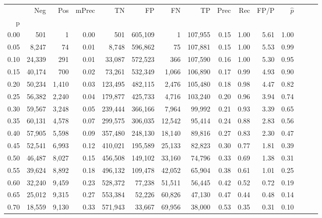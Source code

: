 \begin{tabular}{rrrrrrrrrrrrrrr}
\toprule
{} &     Neg &    Pos & mPrec &       TN &       FP &       FN &       TP &  Prec &   Rec &  FP/P & $\hat{p}$ \\
p    &         &        &       &          &          &          &          &       &       &       &           \\
\midrule
0.00 &     501 &      1 &  0.00 &      501 &  605,109 &        1 &  107,955 &  0.15 &  1.00 &  5.61 &      1.00 \\
0.05 &   8,247 &     74 &  0.01 &    8,748 &  596,862 &       75 &  107,881 &  0.15 &  1.00 &  5.53 &      0.99 \\
0.10 &  24,339 &    291 &  0.01 &   33,087 &  572,523 &      366 &  107,590 &  0.16 &  1.00 &  5.30 &      0.95 \\
0.15 &  40,174 &    700 &  0.02 &   73,261 &  532,349 &    1,066 &  106,890 &  0.17 &  0.99 &  4.93 &      0.90 \\
0.20 &  50,234 &  1,410 &  0.03 &  123,495 &  482,115 &    2,476 &  105,480 &  0.18 &  0.98 &  4.47 &      0.82 \\
0.25 &  56,382 &  2,240 &  0.04 &  179,877 &  425,733 &    4,716 &  103,240 &  0.20 &  0.96 &  3.94 &      0.74 \\
0.30 &  59,567 &  3,248 &  0.05 &  239,444 &  366,166 &    7,964 &   99,992 &  0.21 &  0.93 &  3.39 &      0.65 \\
0.35 &  60,131 &  4,578 &  0.07 &  299,575 &  306,035 &   12,542 &   95,414 &  0.24 &  0.88 &  2.83 &      0.56 \\
0.40 &  57,905 &  5,598 &  0.09 &  357,480 &  248,130 &   18,140 &   89,816 &  0.27 &  0.83 &  2.30 &      0.47 \\
0.45 &  52,541 &  6,993 &  0.12 &  410,021 &  195,589 &   25,133 &   82,823 &  0.30 &  0.77 &  1.81 &      0.39 \\
0.50 &  46,487 &  8,027 &  0.15 &  456,508 &  149,102 &   33,160 &   74,796 &  0.33 &  0.69 &  1.38 &      0.31 \\
0.55 &  39,624 &  8,892 &  0.18 &  496,132 &  109,478 &   42,052 &   65,904 &  0.38 &  0.61 &  1.01 &      0.25 \\
0.60 &  32,240 &  9,459 &  0.23 &  528,372 &   77,238 &   51,511 &   56,445 &  0.42 &  0.52 &  0.72 &      0.19 \\
0.65 &  25,012 &  9,315 &  0.27 &  553,384 &   52,226 &   60,826 &   47,130 &  0.47 &  0.44 &  0.48 &      0.14 \\
0.70 &  18,559 &  9,130 &  0.33 &  571,943 &   33,667 &   69,956 &   38,000 &  0.53 &  0.35 &  0.31 &      0.10 \\

\end{tabular}
